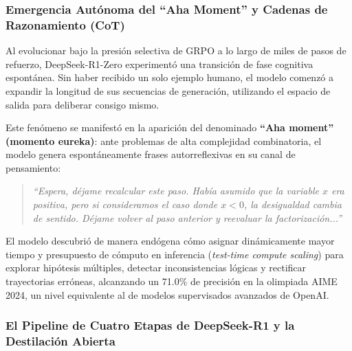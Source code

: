 \subsubsection{Emergencia Autónoma del ``Aha Moment'' y Cadenas de Razonamiento (CoT)}

Al evolucionar bajo la presión selectiva de GRPO a lo largo de miles de pasos de refuerzo, DeepSeek-R1-Zero experimentó una transición de fase cognitiva espontánea. Sin haber recibido un solo ejemplo humano, el modelo comenzó a expandir la longitud de sus secuencias de generación, utilizando el espacio de salida para deliberar consigo mismo.

Este fenómeno se manifestó en la aparición del denominado \textbf{``Aha moment'' (momento eureka)}: ante problemas de alta complejidad combinatoria, el modelo genera espontáneamente frases autorreflexivas en su canal de pensamiento:
\begin{quote}
\textit{``Espera, déjame recalcular este paso. Había asumido que la variable $x$ era positiva, pero si consideramos el caso donde $x < 0$, la desigualdad cambia de sentido. Déjame volver al paso anterior y reevaluar la factorización...''}
\end{quote}

El modelo descubrió de manera endógena cómo asignar dinámicamente mayor tiempo y presupuesto de cómputo en inferencia (\textit{test-time compute scaling}) para explorar hipótesis múltiples, detectar inconsistencias lógicas y rectificar trayectorias erróneas, alcanzando un 71.0\% de precisión en la olimpiada AIME 2024, un nivel equivalente al de modelos supervisados avanzados de OpenAI.

\subsubsection{El Pipeline de Cuatro Etapas de DeepSeek-R1 y la Destilación Abierta}

